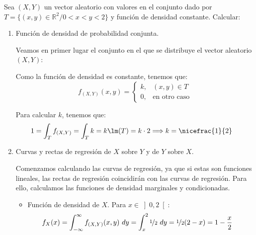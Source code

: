 \begin{ejercicio}
    Sea $(X,Y)$ un vector aleatorio con valores en el conjunto dado por $T=\{(x, y) \in \mathbb{R}^2/0 < x < y < 2\}$ y función de densidad constante. Calcular:
    \begin{enumerate}
        \item Función de densidad de probabilidad conjunta.
        
        Veamos en primer lugar el conjunto en el que se distribuye el vector aleatorio $(X,Y)$:
        \begin{figure}[H]
            \centering
        \end{figure}

        Como la función de densidad es constante, tenemos que:
        \begin{equation*}
            f_{(X,Y)}(x, y) = \begin{cases}
                k, & (x, y) \in T \\
                0, & \text{en otro caso}
            \end{cases}
        \end{equation*}

        Para calcular $k$, tenemos que:
        \begin{align*}
            1 &= \int_{T} f_{(X,Y)} = \int_T k = k\lm(T) = k\cdot 2
            \Longrightarrow k=\nicefrac{1}{2}
        \end{align*}
        \item Curvas y rectas de regresión de $X$ sobre $Y$ y de $Y$ sobre $X$.
        
        Comenzamos calculando las curvas de regresión, ya que si estas son funciones lineales, las rectas de regresión coincidirán con las curvas de regresión.
        Para ello, calculamos las funciones de densidad marginales y condicionadas.
        \begin{itemize}
            \item Función de densidad de $X$. Para $x\in \left]0,2\right[$:
            \begin{align*}
                f_X(x) &= \int_{-\infty}^{\infty} f_{(X,Y)}(x, y) \ dy
                = \int_{x}^{2} \nicefrac{1}{2} \ dy = \nicefrac{1}{2}(2-x)
                = 1-\frac{x}{2}
            \end{align*}


\end{itemize}
\end{enumerate}
\end{ejercicio}
